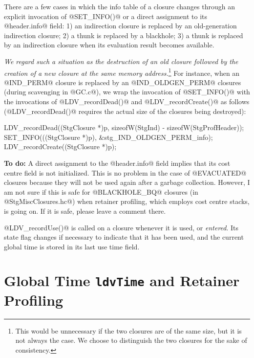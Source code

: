 \documentclass{article}
\begin{document}
There are a few cases in which the info table of a closure changes through
an explicit invocation of @SET_INFO()@ or a direct assignment to its @header.info@
field: 1) an indirection closure is replaced by an old-generation 
indirection closure; 2) a thunk is replaced by a blackhole; 3) a thunk is replaced 
by an indirection closure when its evaluation result becomes available.

\emph{We regard such a situation as
the destruction of an old closure followed by the creation of a new closure
at the same memory address.}\footnote{This would be unnecessary if the two closures
are of the same size, but it is not always the case. We choose to distinguish
the two closures for the sake of consistency.}
For instance, when an @IND_PERM@ closure is replaced by an @IND_OLDGEN_PERM@
closures (during scavenging in @GC.c@), we wrap the invocation of @SET_INFO()@ with 
the invocations of @LDV_recordDead()@ and @LDV_recordCreate()@ as follows 
(@LDV_recordDead()@ requires the actual size of the closures being destroyed):

\begin{code}
  LDV_recordDead((StgClosure *)p, sizeofW(StgInd) - sizeofW(StgProfHeader));
  SET_INFO(((StgClosure *)p), &stg_IND_OLDGEN_PERM_info);
  LDV_recordCreate((StgClosure *)p);
\end{code}

\textbf{To do:}
A direct assignment to the @header.info@ field implies that its cost centre 
field is not initialized. This is no problem in the case of @EVACUATED@ closures 
because they will 
not be used again after a garbage collection. However, I am not sure if this is safe
for @BLACKHOLE_BQ@ closures (in @StgMiscClosures.hc@) when retainer profiling, 
which employs cost centre stacks, is going on. 
If it is safe, please leave a comment there.

@LDV_recordUse()@ is called on a closure whenever it is used, or \emph{entered}.
Its state flag changes if necessary to indicate that it has been used, and
the current global time is stored in its last use time field. 

\section{Global Time \texttt{ldvTime} and Retainer Profiling}
\end{document}
